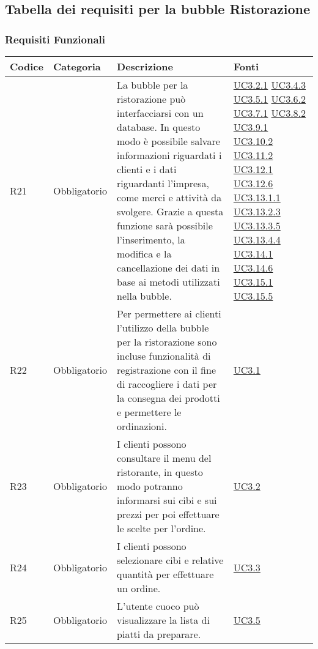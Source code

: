 \subsection{Tabella dei requisiti per la bubble Ristorazione}

\subsubsection{Requisiti Funzionali}

\begin{longtable}{|P{1.5cm}|P{3cm}|P{6cm}|P{2.5cm}|}
	\hline \textbf{Codice} & \textbf{Categoria} & \textbf{Descrizione} & \textbf{Fonti} \\
	\hline R21 & Obbligatorio & La bubble per la ristorazione può interfacciarsi con un database. In questo modo è possibile salvare informazioni riguardati i clienti e i dati riguardanti l’impresa, come merci e attività da svolgere. Grazie a questa funzione sarà possibile l’inserimento, la modifica e la cancellazione dei dati in base ai metodi utilizzati nella bubble. & \hyperref[UC3.2.1]{UC3.2.1} \hyperref[UC3.4.3]{UC3.4.3} \hyperref[UC3.5.1]{UC3.5.1} \hyperref[UC3.6.2]{UC3.6.2} \hyperref[UC3.7.1]{UC3.7.1} \hyperref[UC3.8.2]{UC3.8.2} \hyperref[UC3.9.1]{UC3.9.1} \hyperref[UC3.10.2]{UC3.10.2} \hyperref[UC3.11.2]{UC3.11.2} \hyperref[UC3.12.1]{UC3.12.1} \hyperref[UC3.12.6]{UC3.12.6} \hyperref[UC3.13.1.1]{UC3.13.1.1} \hyperref[UC3.13.2.3]{UC3.13.2.3} \hyperref[UC3.13.3.5]{UC3.13.3.5} \hyperref[UC3.13.4.4]{UC3.13.4.4} \hyperref[UC3.14.1]{UC3.14.1} \hyperref[UC3.14.6]{UC3.14.6} \hyperref[UC3.15.1]{UC3.15.1} \hyperref[UC3.15.5]{UC3.15.5} \\
	\hline R22 & Obbligatorio & Per permettere ai clienti l’utilizzo della bubble per la ristorazione sono incluse funzionalità di registrazione con il fine di raccogliere i dati per la consegna dei prodotti e permettere le ordinazioni. & \hyperref[UC3.1]{UC3.1} \\
	\hline R23 & Obbligatorio & I clienti possono consultare il menu del ristorante, in questo modo potranno informarsi sui cibi e sui prezzi per poi effettuare le scelte per l’ordine. & \hyperref[UC3.2]{UC3.2} \\
	\hline R24 & Obbligatorio & I clienti possono selezionare cibi e relative quantità per effettuare un ordine. & \hyperref[UC3.3]{UC3.3} \\
	\hline R25 & Obbligatorio & L’utente cuoco può visualizzare la lista di piatti da preparare. & \hyperref[UC3.5]{UC3.5} \\

\end{longtable}
